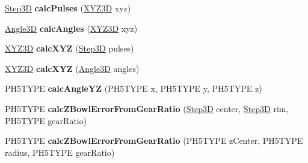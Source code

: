 \begin{DoxyCompactItemize}
\item 
\hypertarget{classfirestep_1_1_delta_calculator_a9155b76932231673ba4aa7de70c3fc91}{\hyperlink{classfirestep_1_1_step3_d}{Step3\+D} {\bfseries calc\+Pulses} (\hyperlink{classfirestep_1_1_x_y_z3_d}{X\+Y\+Z3\+D} xyz)}\label{classfirestep_1_1_delta_calculator_a9155b76932231673ba4aa7de70c3fc91}

\item 
\hypertarget{classfirestep_1_1_delta_calculator_ac803a97a5516c8006c056f3362892173}{\hyperlink{structfirestep_1_1_angle3_d}{Angle3\+D} {\bfseries calc\+Angles} (\hyperlink{classfirestep_1_1_x_y_z3_d}{X\+Y\+Z3\+D} xyz)}\label{classfirestep_1_1_delta_calculator_ac803a97a5516c8006c056f3362892173}

\item 
\hypertarget{classfirestep_1_1_delta_calculator_a6c0cb3ccb4b38995a4e9896696e21687}{\hyperlink{classfirestep_1_1_x_y_z3_d}{X\+Y\+Z3\+D} {\bfseries calc\+X\+Y\+Z} (\hyperlink{classfirestep_1_1_step3_d}{Step3\+D} pulses)}\label{classfirestep_1_1_delta_calculator_a6c0cb3ccb4b38995a4e9896696e21687}

\item 
\hypertarget{classfirestep_1_1_delta_calculator_a8bbb5bbf75ee625dd8a00ebe1db1ae5e}{\hyperlink{classfirestep_1_1_x_y_z3_d}{X\+Y\+Z3\+D} {\bfseries calc\+X\+Y\+Z} (\hyperlink{structfirestep_1_1_angle3_d}{Angle3\+D} angles)}\label{classfirestep_1_1_delta_calculator_a8bbb5bbf75ee625dd8a00ebe1db1ae5e}

\item 
\hypertarget{classfirestep_1_1_delta_calculator_a498f39203d9706edc49e02b6da6b1edb}{P\+H5\+T\+Y\+P\+E {\bfseries calc\+Angle\+Y\+Z} (P\+H5\+T\+Y\+P\+E x, P\+H5\+T\+Y\+P\+E y, P\+H5\+T\+Y\+P\+E z)}\label{classfirestep_1_1_delta_calculator_a498f39203d9706edc49e02b6da6b1edb}

\item 
\hypertarget{classfirestep_1_1_delta_calculator_afd8f6dfdc9aa25b94e009086b4268222}{P\+H5\+T\+Y\+P\+E {\bfseries calc\+Z\+Bowl\+Error\+From\+Gear\+Ratio} (\hyperlink{classfirestep_1_1_step3_d}{Step3\+D} center, \hyperlink{classfirestep_1_1_step3_d}{Step3\+D} rim, P\+H5\+T\+Y\+P\+E gear\+Ratio)}\label{classfirestep_1_1_delta_calculator_afd8f6dfdc9aa25b94e009086b4268222}

\item 
\hypertarget{classfirestep_1_1_delta_calculator_aa18316720a01e646ef1ae1e8f1550199}{P\+H5\+T\+Y\+P\+E {\bfseries calc\+Z\+Bowl\+Error\+From\+Gear\+Ratio} (P\+H5\+T\+Y\+P\+E z\+Center, P\+H5\+T\+Y\+P\+E radius, P\+H5\+T\+Y\+P\+E gear\+Ratio)}\label{classfirestep_1_1_delta_calculator_aa18316720a01e646ef1ae1e8f1550199}


\end{DoxyCompactItemize}
